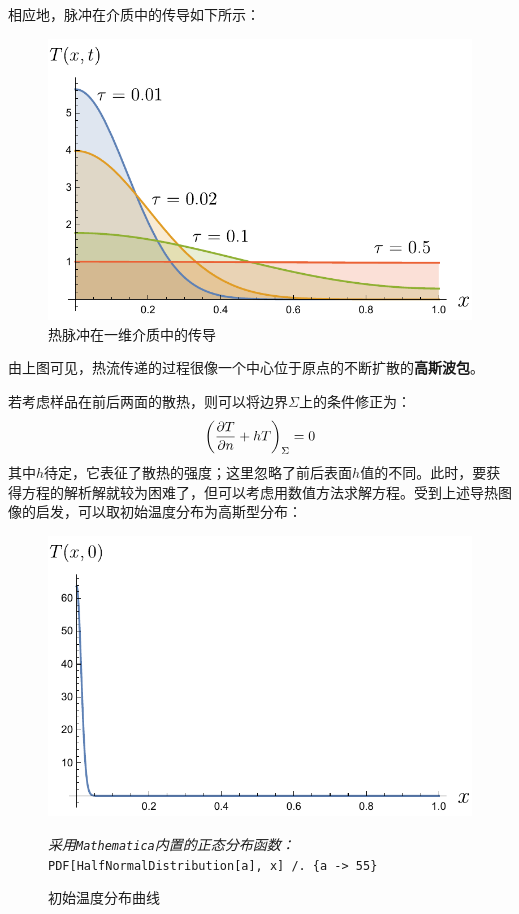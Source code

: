 \documentclass[a4paper,11pt]{article}
\begin{document}
	相应地，脉冲在介质中的传导如下所示：
	\begin{figure}[H]
	\centering
	\includegraphics[width=.6\linewidth]{heatConducting.pdf}
	\caption{热脉冲在一维介质中的传导}
	\end{figure}\noindent%
	由上图可见，热流传递的过程很像一个中心位于原点的不断扩散的\textbf{高斯波包}。
	
	若考虑样品在前后两面的散热，则可以将边界$\Sigma$上的条件修正为：
	\begin{equation}
		\pqty{\pdv{T}{n} + hT}_\Sigma = 0
	\end{equation}
	其中$h$待定，它表征了散热的强度；这里忽略了前后表面$h$值的不同。此时，要获得方程的解析解就较为困难了，但可以考虑用数值方法求解方程。受到上述导热图像的启发，可以取初始温度分布为高斯型分布：
	\begin{figure}[H]
	\centering
	\includegraphics[width=.6\linewidth]{initCondition.pdf}
	\caption{初始温度分布曲线}
	\footnotesize
	\textit{采用\texttt{Mathematica}内置的正态分布函数：}
	\texttt{PDF[HalfNormalDistribution[a], x] /. \{a -> 55\}}
	\end{figure}
	
\end{document}
